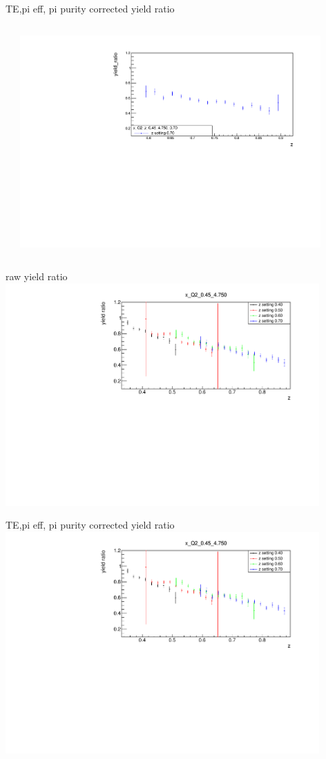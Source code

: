 \begin{frame}{TE,pi eff, pi purity corrected yield ratio}
\begin{columns}
\begin{column}[T]{0.5\textwidth}
\end{column}
\begin{column}[T]{0.5\textwidth}
\includegraphics[width = 0.9\textwidth]{results/yield/statistics_corr/x_Q2_z_0.45_4.750_0.70_ratio.pdf}
\end{column}
\end{columns}
\end{frame}
\begin{frame}{raw yield ratio}
\includegraphics[width = 0.9\textwidth]{results/yield/statistics/x_Q2_0.45_4.750_ratio.pdf}
\end{frame}
\begin{frame}{TE,pi eff, pi purity corrected yield ratio}
\includegraphics[width = 0.9\textwidth]{results/yield/statistics_corr/x_Q2_0.45_4.750_ratio.pdf}
\end{frame}
